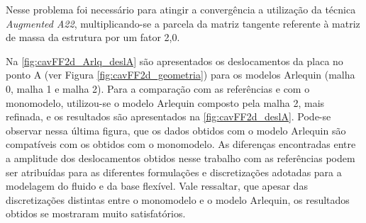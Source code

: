 Nesse problema foi necessário para atingir a convergência a utilização da técnica \textit{Augmented A22}, multiplicando-se a parcela da matriz tangente referente à matriz de massa da estrutura por um fator 2,0.

Na \autoref{fig:cavFF2d_Arlq_deslA} são apresentados os deslocamentos da placa no ponto A (ver Figura \ref{fig:cavFF2d_geometria}) para os modelos Arlequin (malha 0, malha 1 e malha 2). Para a comparação com as referências e com o monomodelo, utilizou-se o modelo Arlequin composto pela malha 2, mais refinada, e os resultados são apresentados na \autoref{fig:cavFF2d_deslA}. Pode-se observar nessa última figura, que os dados obtidos com o modelo Arlequin são compatíveis com os obtidos com o monomodelo. As diferenças encontradas entre a amplitude dos deslocamentos obtidos nesse trabalho com as referências podem ser atribuídas para as diferentes formulações e discretizações adotadas para a modelagem do fluido e da base flexível. Vale ressaltar, que apesar das discretizações distintas entre o monomodelo e o modelo Arlequin, os resultados obtidos se mostraram muito satisfatórios.

